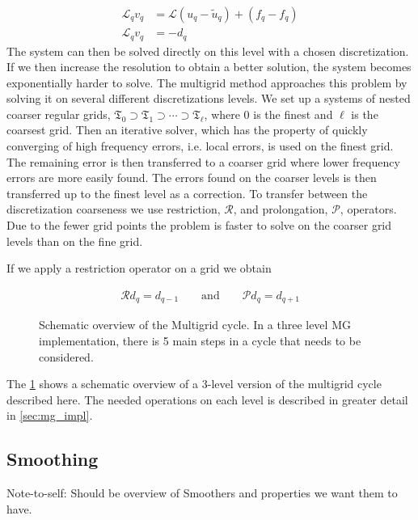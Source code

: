 	\begin{align}
		\mathcal{L}_q v_q &= \mathcal{L}(u_q - \tilde{u}_q)  + (f_q- f_q)
		\\
		\mathcal{L}_q v_q &= - d_q \label{eq:diff_MG}
	\end{align}
	The system can then be solved directly on this level with a chosen discretization.
	If we then increase the resolution to obtain a better solution, the system
	becomes exponentially harder to solve. The multigrid method approaches this problem
	by solving it on several different discretizations levels.
	We set up a systems of nested coarser regular grids,
	\(\mathfrak{T}_0 \supset \mathfrak{T}_{1} \supset \cdots \supset \mathfrak{T}_\ell\),
	where \(0\) is the finest and \(\ell\) is the coarsest grid.
	Then an iterative solver, which has the property of quickly converging of high frequency errors, i.e.
	local errors, is used on the finest grid. The remaining error is then transferred
	to a coarser grid where lower frequency errors are more easily found. The errors
	found on the coarser levels is then transferred up to the finest level as a correction.
	To transfer between the discretization coarseness we use restriction, \( \mathcal{R} \),
	and prolongation, \( \mathcal{P} \), operators. Due to the fewer grid points the problem is
	faster to solve on the coarser grid levels than on the fine grid.

	If we apply a restriction operator on a grid we obtain

	\begin{align}
		\mathcal{R} d_q = d_{q-1} \qquad \text{and} \qquad \mathcal{P} d_q = d_{q + 1}
	\end{align}

	\begin{figure}
	    \center
		
		\caption{Schematic overview of the Multigrid cycle. In a three level MG implementation,
		there is 5 main steps in a cycle that needs to be considered.}
		\label{fig:MG_schematic}
	\end{figure}

	The \cref{fig:MG_schematic} shows a schematic overview of a \(3\)-level
	version of the multigrid cycle described here. The needed operations on each
	level is described in greater detail in \cref{sec:mg_impl}.

	\subsection{Smoothing}
        Note-to-self: Should be overview of Smoothers and properties we want them to have.

